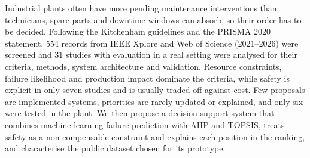 Industrial plants often have more pending maintenance interventions than technicians, spare parts and downtime windows can absorb, so their order has to be decided. Following the Kitchenham guidelines and the PRISMA 2020 statement, 554 records from IEEE Xplore and Web of Science (2021--2026) were screened and 31 studies with evaluation in a real setting were analysed for their criteria, methods, system architecture and validation. Resource constraints, failure likelihood and production impact dominate the criteria, while safety is explicit in only seven studies and is usually traded off against cost. Few proposals are implemented systems, priorities are rarely updated or explained, and only six were tested in the plant. We then propose a decision support system that combines machine learning failure prediction with AHP and TOPSIS, treats safety as a non-compensable constraint and explains each position in the ranking, and characterise the public dataset chosen for its prototype.

